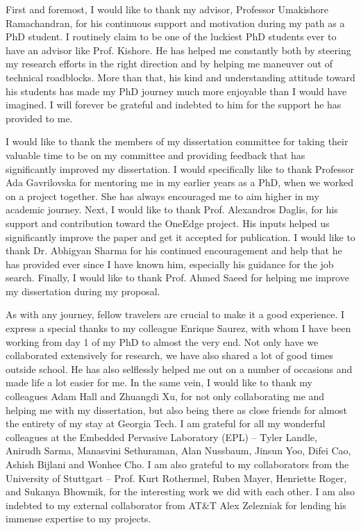 \begin{acknowledgments}
First and foremost, I would like to thank my advisor, Professor Umakishore Ramachandran, for his continuous support and motivation during my path as a PhD student. I routinely claim to be one of the luckiest PhD students ever to have an advisor like Prof. Kishore. He has helped me constantly both by steering my research efforts in the right direction and by helping me maneuver out of technical roadblocks. More than that, his kind and understanding attitude toward his students has made my PhD journey much more enjoyable than I would have imagined. I will forever be grateful and indebted to him for the support he has provided to me.
\par I would like to thank the members of my dissertation committee for taking their valuable time to be on my committee and providing feedback that has significantly improved my dissertation. I would specifically like to thank Professor Ada Gavrilovska for mentoring me in my earlier years as a PhD, when we worked on a project together. She has always encouraged me to aim higher in my academic journey. Next, I would like to thank Prof. Alexandros Daglis, for his support and contribution toward the OneEdge project. His inputs helped us significantly improve the paper and get it accepted for publication. I would like to thank Dr. Abhigyan Sharma for his continued encouragement and help that he has provided ever since I have known him, especially his guidance for the job search. Finally, I would like to thank Prof. Ahmed Saeed for helping me improve my dissertation during my proposal.
\par As with any journey, fellow travelers are crucial to make it a good experience. I express a special thanks to my colleague Enrique Saurez, with whom I have been working from day 1 of my PhD to almost the very end. Not only have we collaborated extensively for research, we have also shared a lot of good times outside school. He has also selflessly helped me out on a number of occasions and made life a lot easier for me. In the same vein, I would like to thank my colleagues Adam Hall and Zhuangdi Xu, for not only collaborating me and helping me with my dissertation, but also being there as close friends for almost the entirety of my stay at Georgia Tech. I am grateful for all my wonderful colleagues at the Embedded Pervasive Laboratory (EPL) -- Tyler Landle, Anirudh Sarma, Manasvini Sethuraman, Alan Nussbaum, Jinsun Yoo, Difei Cao, Ashish Bijlani and Wonhee Cho. I am also grateful to my collaborators from the University of Stuttgart -- Prof. Kurt Rothermel, Ruben Mayer, Henriette Roger, and Sukanya Bhowmik, for the interesting work we did with each other. I am also indebted to my external collaborator from AT\&T Alex Zelezniak for lending his immense expertise to my projects.

\end{acknowledgments}
